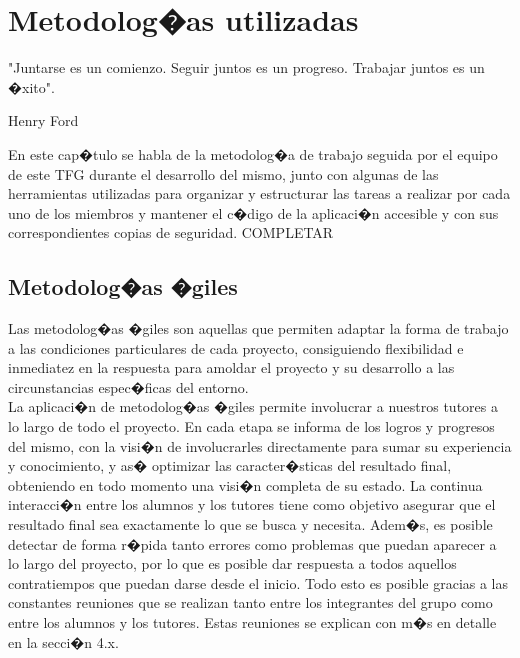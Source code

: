 %
%

\chapter{Metodolog�as utilizadas}

\begin{FraseCelebre}
	\begin{Frase}
		"Juntarse es un comienzo. Seguir juntos es un progreso. Trabajar juntos es un �xito". 
	\end{Frase}
	\begin{Fuente}
		Henry Ford
	\end{Fuente}
\end{FraseCelebre}

En este cap�tulo se habla de la metodolog�a de trabajo seguida por el equipo de este TFG durante el desarrollo del mismo, junto con algunas de las herramientas utilizadas para organizar y estructurar las tareas a realizar por cada uno de los miembros y mantener el c�digo de la aplicaci�n accesible y con sus correspondientes copias de seguridad. COMPLETAR

\section{Metodolog�as �giles}
\label{cap4:sec:Metodologias Agiles}

Las metodolog�as �giles \citep*{tchMetAgiles} son aquellas que permiten adaptar la forma de trabajo a las condiciones particulares de cada proyecto, consiguiendo flexibilidad e inmediatez en la respuesta para amoldar el proyecto y su desarrollo a las circunstancias espec�ficas del entorno.\\


La aplicaci�n de metodolog�as �giles permite involucrar a nuestros tutores a lo largo de todo el proyecto. En cada etapa se informa de los logros y progresos del mismo, con la visi�n de involucrarles directamente para sumar su experiencia y conocimiento, y as� optimizar las caracter�sticas del resultado final, obteniendo en todo momento una visi�n completa de su estado. La continua interacci�n entre los alumnos y los tutores tiene como objetivo asegurar que el resultado final sea exactamente lo que se busca y necesita. Adem�s, es posible detectar de forma r�pida tanto errores como problemas que puedan aparecer a lo largo del proyecto, por lo que es posible dar respuesta a todos aquellos contratiempos que puedan darse desde el inicio. Todo esto es posible gracias a las constantes reuniones que se realizan tanto entre los integrantes del grupo como entre los alumnos y los tutores. Estas reuniones se explican con m�s en detalle en la secci�n 4.x.\\


